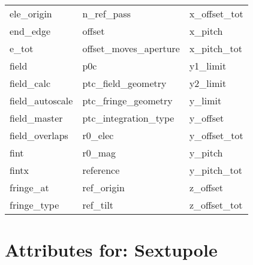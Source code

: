 \begin{tabular}{lll}
ele_origin                  & n_ref_pass                  & x_offset_tot                \\
end_edge                    & offset                      & x_pitch                     \\
e_tot                       & offset_moves_aperture       & x_pitch_tot                 \\
field                       & p0c                         & y1_limit                    \\
field_calc                  & ptc_field_geometry          & y2_limit                    \\
field_autoscale                & ptc_fringe_geometry         & y_limit                     \\
field_master                & ptc_integration_type        & y_offset                    \\
field_overlaps              & r0_elec                     & y_offset_tot                \\
fint                        & r0_mag                      & y_pitch                     \\
fintx                       & reference                   & y_pitch_tot                 \\
fringe_at                   & ref_origin                  & z_offset                    \\
fringe_type                 & ref_tilt                    & z_offset_tot                \\
 \bottomrule
 \end{tabular}
 \vfill
 
 \section{Attributes for: Sextupole}
 \label{s:list.sextupole}
 

